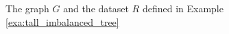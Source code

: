 \documentclass{vgtc}                          %
\numberwithin{algocf}{section}
\theoremstyle{definition}
\theoremstyle{definition}
\theoremstyle{definition}
\theoremstyle{plain}
\begin{document}



\begin{figure}
	\centering
	
	\caption{The graph $G$ and the dataset $R$ defined in Example \ref{exa:tall_imbalanced_tree}}
	\label{fig:GraphConstructionOfExample}
\end{figure}
\end{document}
